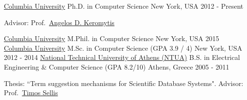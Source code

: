 

\begin{cventries}

  \cventry
    {\href{http://www.cs.columbia.edu/}{Columbia University}}
    {Ph.D. in Computer Science}
    {New York, USA}
    {2012 - Present}
    {
      \begin{cvitems}
      \item{Advisor: Prof.~\href{https://www.cs.columbia.edu/~angelos} {Angelos D. Keromytis}}
      \end{cvitems}
    }
  \cventry
    {\href{http://www.cs.columbia.edu/}{Columbia University}}
    {M.Phil. in Computer Science}
    {New York, USA}
    {2015}
    {}
  \cventry
    {\href{http://www.cs.columbia.edu/}{Columbia University}}
    {M.Sc. in Computer Science (GPA 3.9 / 4)}
    {New York, USA}
    {2012 - 2014}
    {}
  \cventry
    {\href{http://www.ece.ntua.gr/}{National Technical University of Athens (NTUA)}}
    {B.S. in Electrical Engineering \& Computer Science (GPA 8.2/10)}
    {Athens, Greece}
    {2005 - 2011}
    {
      \begin{cvitems}
      \item{Thesis: ``Term suggestion mechanisms for Scientific Database Systems". Advisor: Prof.~\href{https://scholar.google.gr/citations?user=G1Iux80AAAAJ} {Timos Sellis}}
      \end{cvitems}
    }

\end{cventries}
